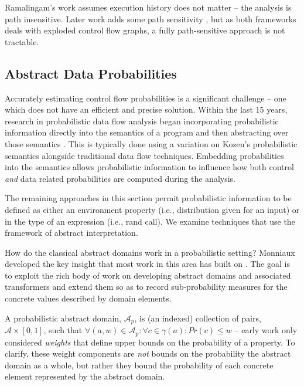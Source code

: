 Ramalingam's work assumes execution history does not matter --  
the analysis is path insensitive.
Later work adds some path sensitivity \cite{mehofer2001novel}, 
but as both frameworks deals with exploded control flow graphs, a fully 
path-sensitive approach is not tractable.

\subsection{Abstract Data Probabilities}
Accurately estimating control flow probabilities is a significant
challenge -- one which does not have an efficient and precise solution.
Within the last 15 years, research in probabilistic data flow analysis
began incorporating probabilistic information directly into
the semantics of a program and then abstracting over 
those semantics \cite{monniaux2000abstract,others}.
This is typically done using a variation on Kozen's 
probabilistic semantics \cite{kozen1981semantics} 
alongside traditional data flow techniques.
Embedding probabilities into the semantics allows probabilistic
information to influence how both control {\sl and} data related
probabilities are computed during the analysis.

The remaining approaches in this section permit probabilistic
information to be defined as either an environment property
(i.e., distribution given for an input) or in the type of
an expression (i.e., rand call).
We examine techniques that use the framework of abstract
interpretation.

How do the classical abstract domains work in a
probabilistic setting?
Monniaux \cite{monniaux2000abstract} developed the key 
insight that most work in this area has built on 
\cite{monniaux2001backwards,wachterVMCAI10,esparzaSAS11}.
The goal is to exploit the rich body of work on developing
abstract domains and associated transformers and extend them
so as to record sub-probability measures for the concrete values
described by domain elements.  

A probabilistic abstract domain, $\mathcal{A}_p$, 
is (an indexed) collection of pairs, 
$\mathcal{A} \times [0,1]$,
such that $\forall (a,w) \in \mathcal{A}_p : 
\forall c \in \gamma(a) : Pr(c) \le w$ -- early work only
considered \textit{weights} that define upper bounds on the 
probability of a property. 
To clarify, these weight components are \textit{not} bounds on the probability
the abstract domain as a whole, but rather they bound the probability
of each concrete element represented by the abstract domain.

